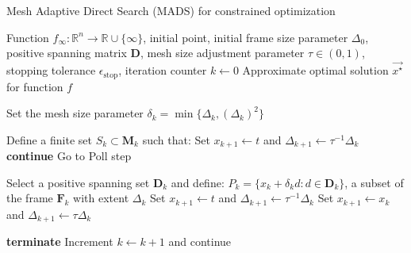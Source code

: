 \begin{algorithm}[H]
	\caption{Mesh Adaptive Direct Search (MADS) for constrained optimization}\label{MADS}
	\begin{algorithmic}[1]
		\Require Function $f_{\infty}: \mathbb{R}^n \to \mathbb{R} \cup \{\infty\}$, initial point, initial frame size parameter $\Delta_0$, positive spanning matrix $\mathbf{D}$, mesh size adjustment parameter $\tau \in (0,1)$, stopping tolerance $\epsilon_{\text{stop}}$, iteration counter $k \gets 0$
		\Ensure Approximate optimal solution $\vec{x^{\star}}$ for function $f$
		
		
		
		\State Set the mesh size parameter $\delta_k = \min \{\Delta_k, (\Delta_k)^2\}$
		
		\State Define a finite set $S_k \subset \mathbf{M}_k$ such that:
		\State Set $x_{k+1} \gets t$ and $\Delta_{k+1} \gets \tau^{-1}\Delta_k$
		\State \textbf{continue}
		\Else
		\State Go to Poll step
		\EndIf
		
		\State Select a positive spanning set $\mathbf{D}_{k}$ and define:
		\State $P_k = \{x_k + \delta_k d : d \in \mathbf{D}_{k}\}$, a subset of the frame $\mathbf{F}_k$ with extent $\Delta_k$
		\State Set $x_{k+1} \gets t$ and $\Delta_{k+1} \gets \tau^{-1}\Delta_k$
		\Else
		\State Set $x_{k+1} \gets x_k$ and $\Delta_{k+1} \gets \tau\Delta_k$
		\EndIf
		
		\State \textbf{terminate}
		\Else
		\State Increment $k \gets k+1$ and continue
		\EndIf
		
		\EndWhile
		\EndProcedure
	\end{algorithmic}
\end{algorithm}